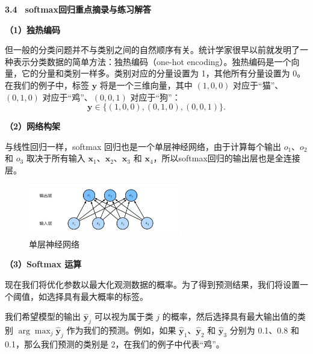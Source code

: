 \documentclass[UTF8]{ctexart}
\begin{document}
	\setlength{\abovedisplayskip}{2pt}
	\setlength{\belowdisplayskip}{2pt}
	\setlength{\abovedisplayshortskip}{2pt}
	\setlength{\belowdisplayshortskip}{2pt}
	\begin{center}
		\heiti{}\textbf{3.4 \, softmax回归重点摘录与练习解答} %
		\vspace{2ex}
	\end{center}
	
	
	\pagestyle{fancy}
	\lhead{}
	\chead{}
	\rhead{}
	\cfoot{\thepage}
	\renewcommand{\headrulewidth}{0pt}
	\renewcommand{\footrulewidth}{0pt} %
	
	\textbf{（1）独热编码}
	
	但一般的分类问题并不与类别之间的自然顺序有关。统计学家很早以前就发明了一种表示分类数据的简单方法：独热编码（one-hot encoding）。独热编码是一个向量，它的分量和类别一样多。类别对应的分量设置为 1，其他所有分量设置为 0。在我们的例子中，标签 $\bm{y}$ 将是一个三维向量，其中 $(1, 0, 0)$ 对应于“猫”、$(0, 1, 0)$ 对应于“鸡”、$(0, 0, 1)$ 对应于“狗”：
	$$
	\bm{y} \in \{(1, 0, 0), (0, 1, 0), (0, 0, 1)\}.
	$$
	
	\textbf{（2）网络构架}
	
	与线性回归一样，softmax 回归也是一个单层神经网络，由于计算每个输出 $o_1$、$o_2$ 和 $o_3$ 取决于所有输入 $\bm{x}_1$、$\bm{x}_2$、$\bm{x}_3$ 和 $\bm{x}_4$，所以softmax回归的输出层也是全连接层。
	\begin{figure}[H]
		\centering
		\includegraphics[width=0.6\textwidth]{3.4_1}
		\caption{单层神经网络}
		\label{fig:1}
	\end{figure}
	
	\textbf{（3）Softmax 运算}
	
	现在我们将优化参数以最大化观测数据的概率。为了得到预测结果，我们将设置一个阈值，如选择具有最大概率的标签。
	
	我们希望模型的输出 $\hat{\bm{y}}_j$ 可以视为属于类 $j$ 的概率，然后选择具有最大输出值的类别 $\arg \max_j \hat{\bm{y}}_j$ 作为我们的预测。例如，如果 $\hat{\bm{y}}_1$、$\hat{\bm{y}}_2$ 和 $\hat{\bm{y}}_3$ 分别为 0.1、0.8 和 0.1，那么我们预测的类别是 2，在我们的例子中代表“鸡”。
	
\end{document}
